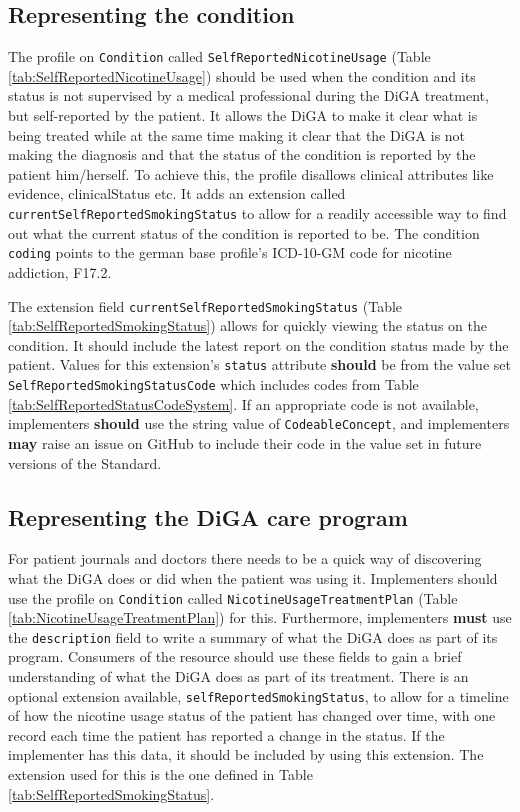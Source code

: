 \documentclass{report}
\def\code#1{\texttt{#1}} %
\newcommand{\tabcondition}{}
\newcommand{\tabplan}{}
\newcommand{\tabstatusext}{}
\newcommand{\tabstatuscs}{}
\begin{document}
\subsection{Representing the condition}
\tabcondition

The profile on \code{Condition} called \code{SelfReportedNicotineUsage} (Table \ref{tab:SelfReportedNicotineUsage}) should be used when the condition and its status is not supervised by a medical professional during the DiGA treatment, but self-reported by the patient.
It allows the DiGA to make it clear what is being treated while at the same time making it clear that the DiGA is not making the diagnosis and that the status of the condition is reported by the patient him/herself. 
To achieve this, the profile disallows clinical attributes like evidence, clinicalStatus etc. It adds an extension called \code{currentSelfReportedSmokingStatus} to allow for a readily accessible way to find out what the current status of the condition is reported to be.
The condition \code{coding} points to the german base profile's \cite{debasis} ICD-10-GM code \cite{icd} for nicotine addiction, F17.2.

\tabstatuscs
\tabstatusext

The extension field \code{currentSelfReportedSmokingStatus} (Table \ref{tab:SelfReportedSmokingStatus}) allows for quickly viewing the status on the condition. It should include the latest report on the condition status made by the patient.
Values for this extension's \code{status} attribute \textbf{should} be from the value set \code{SelfReportedSmokingStatusCode} which includes codes from Table \ref{tab:SelfReportedStatusCodeSystem}. If an appropriate code is not available, implementers \textbf{should} use the string value of \code{CodeableConcept}, 
and implementers \textbf{may} raise an issue on GitHub \cite{github} to include their code in the value set in future versions of the Standard.

\subsection{Representing the DiGA care program}
\tabplan
For patient journals and doctors there needs to be a quick way of discovering what the DiGA does or did when the patient was using it. 
Implementers should use the profile on \code{Condition} called \code{NicotineUsageTreatmentPlan} (Table \ref{tab:NicotineUsageTreatmentPlan}) for this. 
Furthermore, implementers \textbf{must} use the \code{description} field to write a summary of what the DiGA does as part of its program.
Consumers of the resource should use these fields to gain a brief understanding of what the DiGA does as part of its treatment.
There is an optional extension available, \code{selfReportedSmokingStatus}, to allow for a timeline of how the nicotine usage status of the patient has changed over time, with one record each time the patient has reported a change in the status. 
If the implementer has this data, it should be included by using this extension. The extension used for this is the one defined in Table \ref{tab:SelfReportedSmokingStatus}.
\end{document}
